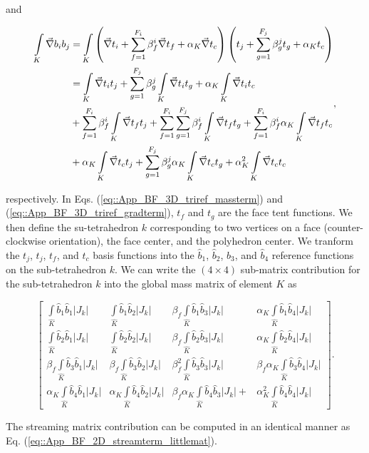 \noindent and

\begin{equation}
\label{eq::App_BF_3D_triref_gradterm}
\begin{aligned}
\int\displaylimits_K\vec{\nabla} b_i b_j &= \int\displaylimits_K \left(\vec{\nabla} t_i +\sum_{f=1}^{F_i} \beta_f^i  \vec{\nabla}t_f + \alpha_K \vec{\nabla} t_c  \right) \left(  t_j+\sum_{g=1}^{F_j} \beta_g^j  t_g  + \alpha_K t_c \right) \\
&= \int\displaylimits_K\vec{\nabla} t_i t_j +\sum_{g=1}^{F_j} \beta_g^j  \int\displaylimits_K  \vec{\nabla} t_i t_g + \alpha_K \int\displaylimits_K  \vec{\nabla}t_i t_c  \\
&+  \sum_{f=1}^{F_i} \beta_f^i \int\displaylimits_K\vec{\nabla} t_f t_j   + \sum_{f=1}^{F_i} \sum_{g=1}^{F_j} \beta_f^i    \int\displaylimits_K  \vec{\nabla} t_f t_g+ \sum_{f=1}^{F_i} \beta_f^i \alpha_K \int\displaylimits_K \vec{\nabla} t_f t_c \\
&+  \alpha_K \int\displaylimits_K \vec{\nabla} t_c t_j + \sum_{g=1}^{F_j}\beta_g^j  \alpha_K  \int\displaylimits_K \vec{\nabla} t_c t_g   +  \alpha_K^2  \int\displaylimits_K \vec{\nabla} t_c t_c
\end{aligned},
\end{equation}

\noindent respectively. In Eqs. (\ref{eq::App_BF_3D_triref_massterm}) and (\ref{eq::App_BF_3D_triref_gradterm}), $t_f$ and $t_g$ are the face tent functions. We then define the su-tetrahedron $k$ corresponding to two vertices on a face (counter-clockwise orientation), the face center, and the polyhedron center. We tranform the $t_j$, $t_j$, $t_f$, and $t_c$ basis functions into the $\hat{b}_1$, $\hat{b}_2$, $\hat{b}_3$, and $\hat{b}_4$ reference functions on the sub-tetrahedron $k$. We can write the $(4 \times 4)$ sub-matrix contribution for the sub-tetrahedron $k$ into the global mass matrix of element $K$ as

\begin{equation}
\label{eq::App_BF_3D_massterm_littlemat}
\left[
\begin{array}{cccc}
\int\limits_{\hat{K}} \hat{b}_1 \hat{b}_1 |J_k| & \int\limits_{\hat{K}} \hat{b}_1 \hat{b}_2 |J_k|& \beta_f \int\limits_{\hat{K}} \hat{b}_1 \hat{b}_3 |J_k| & \alpha_K \int\limits_{\hat{K}} \hat{b}_1 \hat{b}_4 |J_k| \\
\int\limits_{\hat{K}} \hat{b}_2 \hat{b}_1 |J_k| & \int\limits_{\hat{K}} \hat{b}_2 \hat{b}_2 |J_k| & \beta_f \int\limits_{\hat{K}} \hat{b}_2 \hat{b}_3 |J_k| & \alpha_K \int\limits_{\hat{K}} \hat{b}_2 \hat{b}_4 |J_k|  \\
\beta_f \int\limits_{\hat{K}} \hat{b}_3 \hat{b}_1 |J_k| &\beta_f  \int\limits_{\hat{K}} \hat{b}_3\hat{b}_2 |J_k| & \beta_f^2 \int\limits_{\hat{K}} \hat{b}_3 \hat{b}_3 |J_k| & \beta_f \alpha_K \int\limits_{\hat{K}} \hat{b}_3 \hat{b}_4 |J_k|  \\
\alpha_K \int\limits_{\hat{K}} \hat{b}_4 \hat{b}_1 |J_k| &\alpha_K  \int\limits_{\hat{K}} \hat{b}_4\hat{b}_2 |J_k| &  \beta_f \alpha_K \int\limits_{\hat{K}} \hat{b}_4 \hat{b}_3 |J_k| + & \alpha_K^2 \int\limits_{\hat{K}} \hat{b}_4 \hat{b}_4 |J_k| 
\end{array} \right] .
\end{equation}

\noindent The streaming matrix contribution can be computed in an identical manner as Eq. (\ref{eq::App_BF_2D_streamterm_littlemat}).

